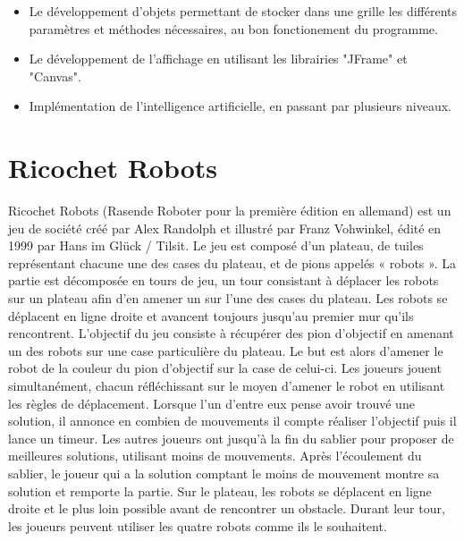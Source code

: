 \documentclass{rapportECL}
\begin{document}
\begin{itemize}
\item Le développement d'objets permettant de stocker dans une grille les différents paramètres et méthodes nécessaires, au bon fonctionement du programme.
\item Le développement de l'affichage en utilisant les librairies "JFrame" et "Canvas".
\item Implémentation de l'intelligence artificielle, en passant par plusieurs niveaux.
\end{itemize}

\newpage
\newpage

\section{Ricochet Robots}
Ricochet Robots (Rasende Roboter pour la première édition en allemand) est un jeu de société créé par Alex Randolph et illustré par Franz Vohwinkel, édité en 1999 par Hans im Glück / Tilsit.
\newline
Le jeu est composé d'un plateau, de tuiles représentant chacune une des cases du plateau, et de pions appelés « robots ». La partie est décomposée en tours de jeu, un tour consistant à déplacer les robots sur un plateau afin d'en amener un sur l'une des cases du plateau. Les robots se déplacent en ligne droite et avancent toujours jusqu'au premier mur qu'ils rencontrent.
\newline
L'objectif du jeu consiste à récupérer des pion d'objectif en amenant un des robots sur une case particulière du plateau.
\newline
Le but est alors d'amener le robot de la couleur du pion d'objectif sur la case de celui-ci. 
\newline
\newline
Les joueurs jouent simultanément, chacun réfléchissant sur le moyen d'amener le robot en utilisant les règles de déplacement. Lorsque l'un d'entre eux pense avoir trouvé une solution, il annonce en combien de mouvements il compte réaliser l'objectif puis il lance un timeur. Les autres joueurs ont jusqu'à la fin du sablier pour proposer de meilleures solutions, utilisant moins de mouvements.
\newline
Après l'écoulement du sablier, le joueur qui a la solution comptant le moins de mouvement montre sa solution et remporte la partie. 
\newline
Sur le plateau, les robots se déplacent en ligne droite et le plus loin possible avant de rencontrer un obstacle. Durant leur tour, les joueurs peuvent utiliser les quatre robots comme ils le souhaitent.
\end{document}
